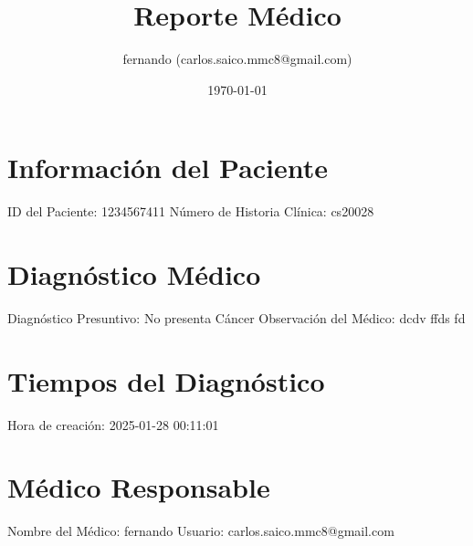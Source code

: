 \documentclass{article}%
\title{Reporte Médico}%
\author{fernando (carlos.saico.mmc8@gmail.com)}%
\date{\today}%
\begin{document}
%
\normalsize%
\maketitle%
\section{Información del Paciente}%
\label{sec:InformacindelPaciente}%
ID del Paciente: 1234567411\newline%
%
Número de Historia Clínica: cs20028\newline%

%
\section{Diagnóstico Médico}%
\label{sec:DiagnsticoMdico}%
Diagnóstico Presuntivo: No presenta Cáncer\newline%
%
Observación del Médico:\newline%
dcdv ffds fd\newline%

%
\section{Tiempos del Diagnóstico}%
\label{sec:TiemposdelDiagnstico}%
Hora de creación: 2025{-}01{-}28 00:11:01\newline%

%
\section{Médico Responsable}%
\label{sec:MdicoResponsable}%
Nombre del Médico: fernando\newline%
%
Usuario: carlos.saico.mmc8@gmail.com\newline%

%
\end{document}
